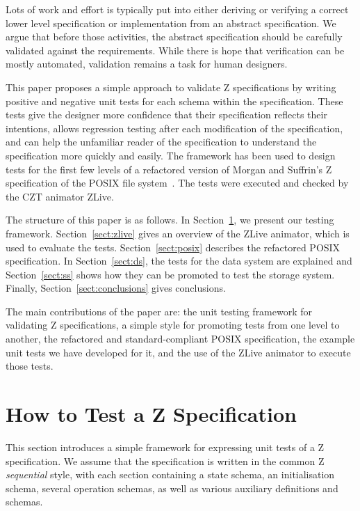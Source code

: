 \documentclass{llncs}
\begin{document}
Lots of work and effort is typically put into either deriving or
verifying a correct lower level specification or implementation from
an abstract specification.  We argue that before those activities, the
abstract specification should be carefully validated against the requirements.
While there is hope that verification can be mostly automated,
validation remains a task for human designers.

This paper proposes a simple approach to validate Z specifications by
writing positive and negative unit tests for each schema within the
specification.  These tests give the designer more confidence that
their specification reflects their intentions, allows regression
testing after each modification of the specification, and can help the
unfamiliar reader of the specification to understand the specification
more quickly and easily.  The framework has been used to design tests
for the first few levels of a refactored version of Morgan and
Suffrin's Z specification of the POSIX file
system~\cite{MorSufTOSE84}.  The tests were executed and checked by
the CZT animator ZLive.

The structure of this paper is as follows.  In
Section~\ref{sect:framework}, we present our testing framework.
Section~\ref{sect:zlive} gives an overview of the ZLive animator,
which is used to evaluate the tests.  Section~\ref{sect:posix}
describes the refactored POSIX specification.  In
Section~\ref{sect:ds}, the tests for the data system are explained
and Section~\ref{sect:ss} shows how they can be promoted to test
the storage system.  Finally, Section~\ref{sect:conclusions} gives
conclusions.

The main contributions of the paper are: the unit testing framework
for validating Z specifications, a simple style for promoting tests
from one level to another, the refactored and standard-compliant POSIX
specification, the example unit tests we have developed for it, and
the use of the ZLive animator to execute those tests.


\section{How to Test a Z Specification}\label{sect:framework}

This section introduces a simple framework for expressing unit tests
of a Z specification.  We assume that the specification is written in
the common Z \emph{sequential} style, with each section containing a
state schema, an initialisation schema, several operation schemas, as
well as various auxiliary definitions and schemas.
\end{document}
